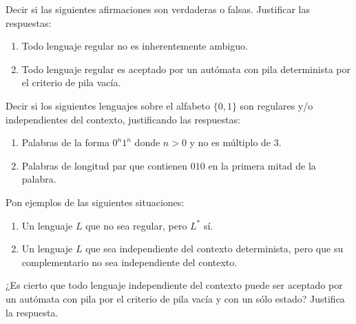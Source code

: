 \documentclass[12pt]{article}
\begin{document}
\begin{ejercicio}[1.25 puntos]
    Decir si las siguientes afirmaciones son verdaderas o falsas. Justificar las respuestas:
    \begin{enumerate}
        \item Todo lenguaje regular no es inherentemente ambiguo.
        \item Todo lenguaje regular es aceptado por un autómata con pila determinista por el criterio de pila vacía.
    \end{enumerate}
\end{ejercicio}

\begin{ejercicio}[1.25 puntos]
    Decir si los siguientes lenguajes sobre el alfabeto $\{0, 1\}$ son regulares y/o independientes del contexto, justificando las respuestas:
    \begin{enumerate}
        \item Palabras de la forma $0^n1^n$ donde $n > 0$ y no es múltiplo de $3$.
        \item Palabras de longitud par que contienen $010$ en la primera mitad de la palabra.
    \end{enumerate}
\end{ejercicio}

\begin{ejercicio}[1.25 puntos]
    Pon ejemplos de las siguientes situaciones:
    \begin{enumerate}
        \item Un lenguaje $L$ que no sea regular, pero $L^*$ sí.
        \item Un lenguaje $L$ que sea independiente del contexto determinista, pero que su complementario no sea independiente del contexto.
    \end{enumerate}
\end{ejercicio}

\begin{ejercicio}[1.25 puntos]
    ¿Es cierto que todo lenguaje independiente del contexto puede ser aceptado por un autómata con pila por el criterio de pila vacía y con un sólo estado? Justifica la respuesta.
\end{ejercicio}

\newpage
\setcounter{ejercicio}{0}
\end{document}
